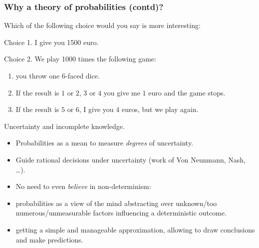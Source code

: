 \documentclass{beamer}
\begin{document}
\begin{frame}
  \frametitle{Why a theory of probabilities (contd)?}
  Which of the following choice would you say is more interesting:
  
  \begin{exampleblock}{Choice 1.}
    I give you 1500 euro.
  \end{exampleblock}

  \begin{exampleblock}{Choice 2.}
    We play 1000 times the following game:
    \begin{enumerate}
    \item you throw one $6$-faced dice.
    \item If the result is $1$ or $2$, $3$ or $4$ you give me $1$ euro and the game stops.
    \item If the result is $5$ or $6$, I give you $4$ euros, but we play again.
    \end{enumerate}
  \end{exampleblock}

\end{frame}

\begin{frame}
  
  \begin{block}{Uncertainty and incomplete knowledge.}
    \begin{itemize}
    \item Probabilities as a mean to measure \emph{degrees} of uncertainty.
    \item Guide rational decisions under uncertainty (work of Von Neunmann, Nash, \dots).
    \item No need to even \emph{believe} in non-determinism:
    \item probabilities as a view of the mind abstracting over unknown/too numerous/unmeasurable factors influencing a deterministic outcome.
    \item getting a simple and manageable approximation, allowing to draw conclusions and make predictions.
    \end{itemize}
  \end{block}
 
\end{frame}
\end{document}
